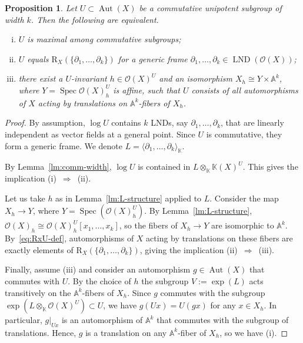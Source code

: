 \documentclass[12pt,a4paper]{amsart}
\theoremstyle{plain}
\newtheorem{proposition}[theorem]{Proposition}
\theoremstyle{definition}
\theoremstyle{remark}
\def\Aut{\operatorname{Aut}}
\def\LND{\operatorname{LND}}
\def\Spec{\operatorname{Spec}}
\def\AA{{\mathbb A}}
\def\K{{\mathbb K}}
\def\cO{{\mathcal O}}
\begin{document}
   \begin{proposition}\label{pr:max-commut}
      Let $U\subset \Aut(X)$ be a commutative unipotent subgroup of width $k$. 
      Then the following are equivalent.
      \begin{enumerate}[(i)]
         \item $U$ is maximal among commutative subgroups;
         \item $U$ equals 
         $\mathrm{R}_X(\{\partial_1,    \ldots,\partial_k\})$
         for a generic frame $\partial_1,\ldots,\partial_k\in\LND(\cO(X))$;
         \item there exist a $U$-invariant $h\in \cO(X)^U$ and an isomorphism $X_h \cong Y \times \AA^k$, where $Y=\Spec \cO(X)_h^U$ is affine, such that $U$ consists of all automorphisms of $X$ acting by translations on $\AA^k$-fibers of $X_h$.
      \end{enumerate}
   \end{proposition}
   \begin{proof}
      By assumption, $\log U$ contains $k$ LNDs, say $\partial_1,\ldots,\partial_k$, that are linearly independent as vector fields at a general point. Since $U$ is commutative, they form a generic frame.
      We denote $L = \langle\partial_1,    \ldots,\partial_k\rangle_\K$.

      By Lemma~\ref{lm:comm-width}, $\log U$ is contained in $L \otimes_\K \K(X)^U$. This gives the implication (i)~$\Rightarrow$~(ii).

      Let us take $h$ as in Lemma~\ref{lm:L-structure} applied to $L$. 
      Consider the map $X_h\to Y$, where $Y = \Spec(\cO(X)_h^U)$. 
      By Lemma~\ref{lm:L-structure}, $\cO(X)_h\cong\cO(X)_h^U[x_1,\ldots,x_k]$, so the fibers of $X_h\to Y$ are isomorphic to $\AA^k$. By~\eqref{eq:RxU-def}, automorphisms of $X$ acting by translations on these fibers are exactly elements of $\mathrm{R}_X(\{\partial_1,\ldots,\partial_k\})$, giving the implication (ii)~$\Rightarrow$~(iii).

      Finally, assume (iii) and consider an automorphism $g\in\Aut(X)$ that commutes with $U$. 
      By the choice of $h$ the subgroup $V:=\exp(L)$ acts transitively on the $\AA^k$-fibers of $X_h$.
      Since $g$ commutes with the subgroup
      $\exp(L\otimes_\K \cO(X)^U)\subset U$, we have $g(U x)=U (g x)$ for any $x\in X_h$.
      In particular, $g|_{U x}$ is an automorphism of $\AA^k$ that commutes with the subgroup of translations.
      Hence, $g$ is a translation on any $\AA^k$-fiber of $X_h$, so we have (i).
   \end{proof}
\end{document}
